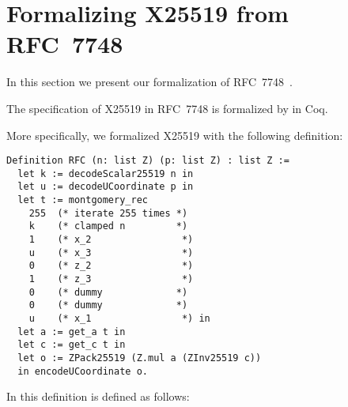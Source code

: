 \section{Formalizing X25519 from RFC~7748}
\label{sec:Coq-RFC}

In this section we present our formalization of RFC~7748~\cite{rfc7748}.

\begin{informaltheorem}
The specification of X25519 in RFC~7748 is formalized by  in Coq.
\end{informaltheorem}

More specifically, we formalized X25519 with the following definition:
\begin{lstlisting}[language=Coq]
Definition RFC (n: list Z) (p: list Z) : list Z :=
  let k := decodeScalar25519 n in
  let u := decodeUCoordinate p in
  let t := montgomery_rec
    255  (* iterate 255 times *)
    k    (* clamped n         *)
    1    (* x_2                *)
    u    (* x_3                *)
    0    (* z_2                *)
    1    (* z_3                *)
    0    (* dummy             *)
    0    (* dummy             *)
    u    (* x_1                *) in
  let a := get_a t in
  let c := get_c t in
  let o := ZPack25519 (Z.mul a (ZInv25519 c))
  in encodeUCoordinate o.
\end{lstlisting}

In this definition  is defined as follows:

